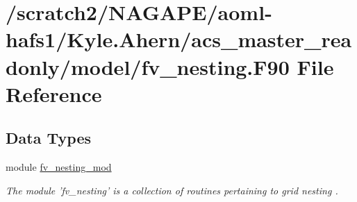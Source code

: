 \section{/scratch2/\-N\-A\-G\-A\-P\-E/aoml-\/hafs1/\-Kyle.Ahern/acs\-\_\-master\-\_\-readonly/model/fv\-\_\-nesting.F90 File Reference}
\label{fv__nesting_8F90}
\subsection*{Data Types}
\begin{DoxyCompactItemize}
\item 
module \hyperlink{classfv__nesting__mod}{fv\-\_\-nesting\-\_\-mod}
\begin{DoxyCompactList}\small\item\em The module 'fv\-\_\-nesting' is a collection of routines pertaining to grid nesting \cite{harris2013two}. \end{DoxyCompactList}\end{DoxyCompactItemize}
